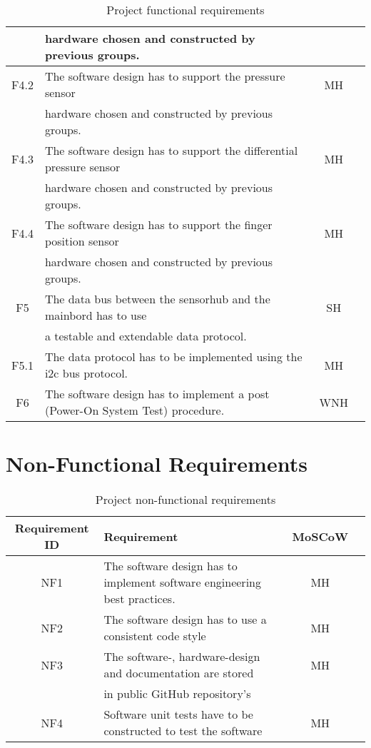 \begin{table}[hb!]
\begin{tabular}{ |c|l|c|c| }
       & hardware chosen and constructed by previous groups. & \\
\hline
 F4.2  & The software design has to support the pressure sensor & MH \\
       & hardware chosen and constructed by previous groups. & \\
\hline
 F4.3  & The software design has to support the differential pressure sensor & MH \\
       & hardware chosen and constructed by previous groups. & \\
\hline
 F4.4  & The software design has to support the finger position sensor & MH \\
       & hardware chosen and constructed by previous groups. & \\
\hline
 F5    & The data bus between the sensorhub and the mainbord has to use & SH\\
       & a testable and extendable data protocol. &   \\
 \hline
 F5.1  & The data protocol has to be implemented using the i2c bus protocol. & MH \\
 \hline
 F6    & The software design has to implement a post (Power-On System Test) procedure. & WNH \\ 
 \hline
\end{tabular}
 \caption{Project functional requirements}
 \label{tab:functional_requirements}
\end{table}
\section{Non-Functional Requirements}
\begin{table}[!hb]
\begin{tabular}{ |c|l|c|c| } 
 \hline
 Requirement ID & Requirement & MoSCoW \\ 
 \hline
 \hline
 NF1    & The software design has to implement software engineering best practices.  & MH \\
 \hline
 NF2    & The software design has to use a consistent code style & MH \\
 \hline 
 NF3    & The software-, hardware-design and documentation are stored  & MH \\
        & in public GitHub repository's & \\
\hline
 NF4   & Software unit tests have to be constructed to test the software & MH\\
 \hline
\end{tabular}
 \caption{Project non-functional requirements}
 \label{tab:non_functional_requirements}
\end{table}
